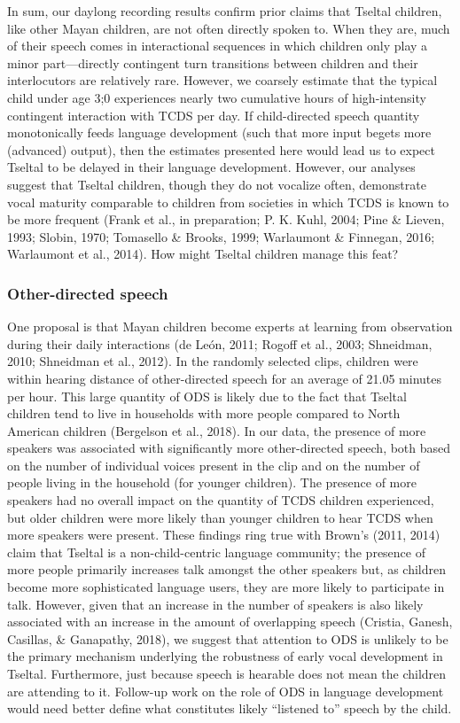 \documentclass[floatsintext,man]{apa6}
\theoremstyle{definition}
\theoremstyle{definition}
\theoremstyle{definition}
\theoremstyle{remark}
\begin{document}
In sum, our daylong recording results confirm prior claims that Tseltal
children, like other Mayan children, are not often directly spoken to.
When they are, much of their speech comes in interactional sequences in
which children only play a minor part---directly contingent turn
transitions between children and their interlocutors are relatively
rare. However, we coarsely estimate that the typical child under age 3;0
experiences nearly two cumulative hours of high-intensity contingent
interaction with TCDS per day. If child-directed speech quantity
monotonically feeds language development (such that more input begets
more (advanced) output), then the estimates presented here would lead us
to expect Tseltal to be delayed in their language development. However,
our analyses suggest that Tseltal children, though they do not vocalize
often, demonstrate vocal maturity comparable to children from societies
in which TCDS is known to be more frequent (Frank et al., in
preparation; P. K. Kuhl, 2004; Pine \& Lieven, 1993; Slobin, 1970;
Tomasello \& Brooks, 1999; Warlaumont \& Finnegan, 2016; Warlaumont et
al., 2014). How might Tseltal children manage this feat?

\subsubsection{Other-directed speech}\label{other-directed-speech}

One proposal is that Mayan children become experts at learning from
observation during their daily interactions (de León, 2011; Rogoff et
al., 2003; Shneidman, 2010; Shneidman et al., 2012). In the randomly
selected clips, children were within hearing distance of other-directed
speech for an average of 21.05 minutes per hour. This large quantity of
ODS is likely due to the fact that Tseltal children tend to live in
households with more people compared to North American children
(Bergelson et al., 2018). In our data, the presence of more speakers was
associated with significantly more other-directed speech, both based on
the number of individual voices present in the clip and on the number of
people living in the household (for younger children). The presence of
more speakers had no overall impact on the quantity of TCDS children
experienced, but older children were more likely than younger children
to hear TCDS when more speakers were present. These findings ring true
with Brown's (2011, 2014) claim that Tseltal is a non-child-centric
language community; the presence of more people primarily increases talk
amongst the other speakers but, as children become more sophisticated
language users, they are more likely to participate in talk. However,
given that an increase in the number of speakers is also likely
associated with an increase in the amount of overlapping speech
(Cristia, Ganesh, Casillas, \& Ganapathy, 2018), we suggest that
attention to ODS is unlikely to be the primary mechanism underlying the
robustness of early vocal development in Tseltal. Furthermore, just
because speech is hearable does not mean the children are attending to
it. Follow-up work on the role of ODS in language development would need
better define what constitutes likely \enquote{listened to} speech by
the child.
\end{document}
